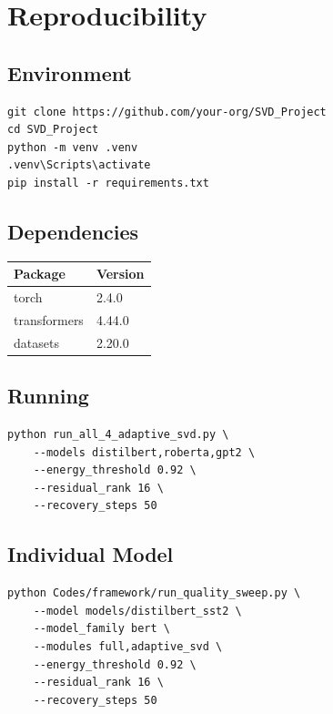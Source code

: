 \section{Reproducibility}

\subsection{Environment}

\begin{lstlisting}
git clone https://github.com/your-org/SVD_Project
cd SVD_Project
python -m venv .venv
.venv\Scripts\activate
pip install -r requirements.txt
\end{lstlisting}

\subsection{Dependencies}

\begin{table}[H]
\centering
\small
\begin{tabular}{ll}
\toprule
\textbf{Package} & \textbf{Version} \\
\midrule
torch & 2.4.0 \\
transformers & 4.44.0 \\
datasets & 2.20.0 \\
\bottomrule
\end{tabular}
\end{table}

\subsection{Running}

\begin{lstlisting}
python run_all_4_adaptive_svd.py \
    --models distilbert,roberta,gpt2 \
    --energy_threshold 0.92 \
    --residual_rank 16 \
    --recovery_steps 50
\end{lstlisting}

\subsection{Individual Model}

\begin{lstlisting}
python Codes/framework/run_quality_sweep.py \
    --model models/distilbert_sst2 \
    --model_family bert \
    --modules full,adaptive_svd \
    --energy_threshold 0.92 \
    --residual_rank 16 \
    --recovery_steps 50
\end{lstlisting}

